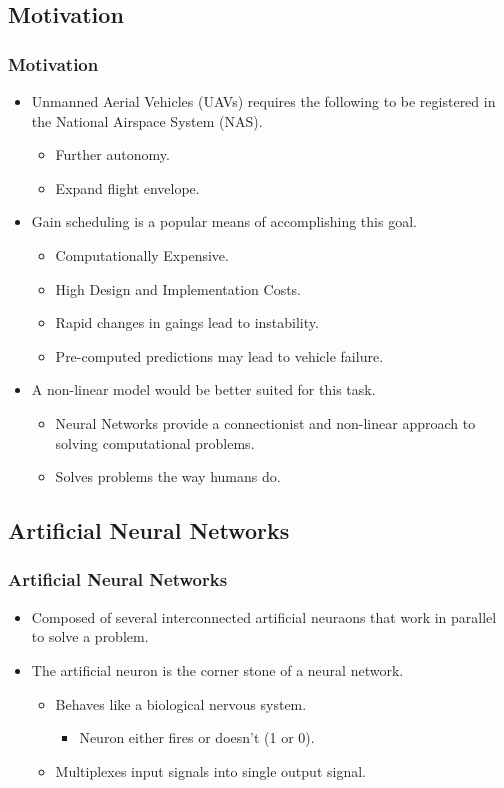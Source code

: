 \documentclass{beamer}
\begin{document}
	\begin{frame}
		\section[Motivation]{Motivation}
		\frametitle{Motivation}
		\begin{itemize}
			\item Unmanned Aerial Vehicles (UAVs) requires the following to be registered in the National Airspace System (NAS).
			\begin{itemize}
				\item Further autonomy.
				\item Expand flight envelope.
			\end{itemize}
			\item Gain scheduling is a popular means of accomplishing this goal.
			\begin{itemize}
				\item Computationally Expensive.
				\item High Design and Implementation Costs.
				\item Rapid changes in gaings lead to instability.
				\item Pre-computed predictions may lead to vehicle failure.
			\end{itemize}
			\item A non-linear model would be better suited for this task.
			\begin{itemize}
				\item Neural Networks provide a connectionist and non-linear approach to solving computational problems.
				\item Solves problems the way humans do.
			\end{itemize}
		\end{itemize}
	\end{frame}
	
	\begin{frame}
		\section[Artificial Neural Networks]{Artificial Neural Networks}
		\frametitle{Artificial Neural Networks}
		\begin{itemize}
			\item Composed of several interconnected artificial neuraons that work in parallel to solve a problem.
			\item The artificial neuron is the corner stone of a neural network.
			\begin{itemize}
				\item Behaves like a biological nervous system.
				\begin{itemize}
					\item Neuron either fires or doesn't (1 or 0).
				\end{itemize}
				\item Multiplexes input signals into single output signal.
			\end{itemize}
		\end{itemize}
	\end{frame}
	
\end{document}
